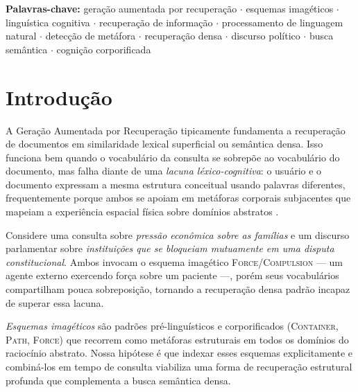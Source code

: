 \documentclass[11pt,a4paper]{article}
\begin{document}
\noindent\textbf{Palavras-chave:} geração aumentada por recuperação $\cdot$ esquemas imagéticos $\cdot$ linguística cognitiva $\cdot$ recuperação de informação $\cdot$ processamento de linguagem natural $\cdot$ detecção de metáfora $\cdot$ recuperação densa $\cdot$ discurso político $\cdot$ busca semântica $\cdot$ cognição corporificada

\section{Introdução}
\label{sec:intro}

A Geração Aumentada por Recuperação \citep{lewis2020rag} tipicamente
fundamenta a recuperação de documentos em similaridade lexical superficial
ou semântica densa.
Isso funciona bem quando o vocabulário da consulta se sobrepõe ao
vocabulário do documento, mas falha diante de uma \emph{lacuna
léxico-cognitiva}: o usuário e o documento expressam a mesma estrutura
conceitual usando palavras diferentes, frequentemente porque ambos se
apoiam em metáforas corporais subjacentes que mapeiam a experiência
espacial física sobre domínios abstratos \citep{johnson1987,lakoff1980}.

Considere uma consulta sobre \emph{pressão econômica sobre as famílias}
e um discurso parlamentar sobre \emph{instituições que se bloqueiam
mutuamente em uma disputa constitucional}.
Ambos invocam o esquema imagético \textsc{Force}/\textsc{Compulsion} —
um agente externo exercendo força sobre um paciente —, porém seus
vocabulários compartilham pouca sobreposição, tornando a recuperação densa
padrão incapaz de superar essa lacuna.

\emph{Esquemas imagéticos} \citep{johnson1987,feldman2006} são padrões
pré-linguísticos e corporificados (\textsc{Container}, \textsc{Path},
\textsc{Force}) que recorrem como metáforas estruturais em todos os
domínios do raciocínio abstrato.
Nossa hipótese é que indexar esses esquemas explicitamente e combiná-los
em tempo de consulta viabiliza uma forma de recuperação estrutural
profunda que complementa a busca semântica densa.
\end{document}
